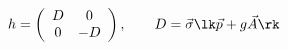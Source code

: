 \begin{equation}
\label{G39}h =\left(\begin{array}{cc}
D & 0 \\ 0 & -D\end{array}\right),\qquad D = \vec\sigma \lk  \vec p +
g \vec A \rk
\end{equation}

